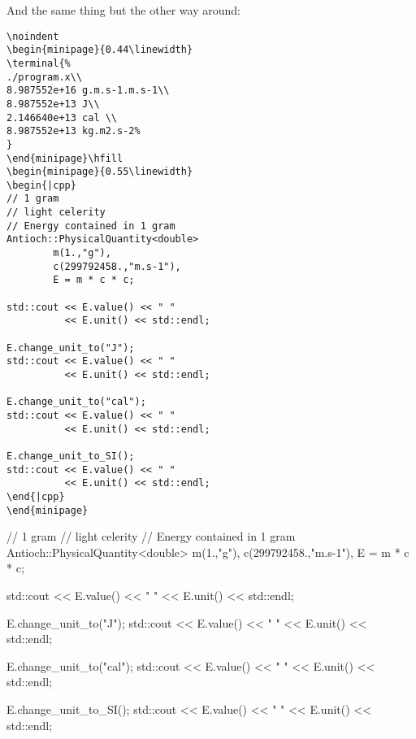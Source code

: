 \documentclass{documentation}
\begin{document}
And the same thing but the other way
around:
\begin{multicols}{2}
\begin{verbatim}
\noindent
\begin{minipage}{0.44\linewidth}
\terminal{%
./program.x\\
8.987552e+16 g.m.s-1.m.s-1\\
8.987552e+13 J\\
2.146640e+13 cal \\
8.987552e+13 kg.m2.s-2%
}
\end{minipage}\hfill
\begin{minipage}{0.55\linewidth}
\begin{|cpp} 
// 1 gram 
// light celerity
// Energy contained in 1 gram
Antioch::PhysicalQuantity<double> 
        m(1.,"g"),
        c(299792458.,"m.s-1"),
        E = m * c * c; 

std::cout << E.value() << " " 
          << E.unit() << std::endl;

E.change_unit_to("J");
std::cout << E.value() << " " 
          << E.unit() << std::endl;

E.change_unit_to("cal");
std::cout << E.value() << " " 
          << E.unit() << std::endl;

E.change_unit_to_SI();
std::cout << E.value() << " " 
          << E.unit() << std::endl;
\end{|cpp}
\end{minipage}
\end{verbatim}
\end{multicols}
\noindent
\begin{minipage}{0.44\linewidth}
\end{minipage}\hfill
\begin{minipage}{0.55\linewidth}
\begin{|cpp} 
// 1 gram 
// light celerity
// Energy contained in 1 gram
Antioch::PhysicalQuantity<double> 
        m(1.,"g"),
        c(299792458.,"m.s-1"),
        E = m * c * c; 

std::cout << E.value() << " " 
          << E.unit() << std::endl;

E.change_unit_to("J");
std::cout << E.value() << " " 
          << E.unit() << std::endl;

E.change_unit_to("cal");
std::cout << E.value() << " " 
          << E.unit() << std::endl;

E.change_unit_to_SI();
std::cout << E.value() << " " 
          << E.unit() << std::endl;
\end{|cpp}
\end{minipage}
\end{document}
